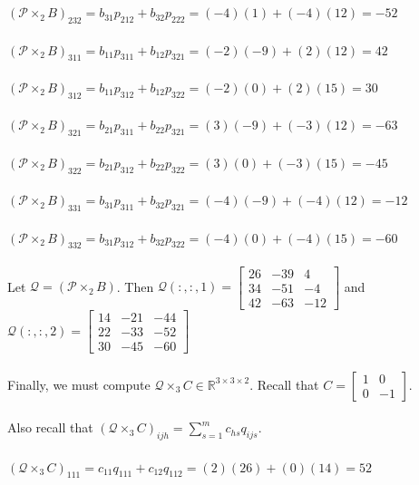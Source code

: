 \documentclass[12pt]{article}
\begin{document}
\\~\\$\left(\mathcal{P} \times_2 B\right)_{232}=b_{31}p_{212}+b_{32}p_{222}=(-4)(1)+(-4)(12)=-52$
\\~\\$\left(\mathcal{P} \times_2 B\right)_{311}=b_{11}p_{311}+b_{12}p_{321}=(-2)(-9)+(2)(12)=42$
\\~\\$\left(\mathcal{P} \times_2 B\right)_{312}=b_{11}p_{312}+b_{12}p_{322}=(-2)(0)+(2)(15)=30$
\\~\\$\left(\mathcal{P} \times_2 B\right)_{321}=b_{21}p_{311}+b_{22}p_{321}=(3)(-9)+(-3)(12)=-63$
\\~\\$\left(\mathcal{P} \times_2 B\right)_{322}=b_{21}p_{312}+b_{22}p_{322}=(3)(0)+(-3)(15)=-45$
\\~\\$\left(\mathcal{P} \times_2 B\right)_{331}=b_{31}p_{311}+b_{32}p_{321}=(-4)(-9)+(-4)(12)=-12$
\\~\\$\left(\mathcal{P} \times_2 B\right)_{332}=b_{31}p_{312}+b_{32}p_{322}=(-4)(0)+(-4)(15)=-60$
\\~\\Let $\mathcal{Q}=\left(\mathcal{P} \times_{2} B\right)$. Then $\mathcal{Q}\left(:, :, 1\right)=\left[\begin{array}{ccc}{26} & {-39} & {4} \\ {34} & {-51} & {-4} \\ {42} & {-63} & {-12}\end{array}\right]$ and $\mathcal{Q}\left(:, :, 2\right)=\left[\begin{array}{ccc}{14} & {-21} & {-44} \\ {22} & {-33} & {-52} \\ {30} & {-45} & {-60}\end{array}\right]$
\\~\\Finally, we must compute $\mathcal{Q} \times_{3} C\in\mathbb{R}^{3\times 3\times 2}$. Recall that $C=\left[\begin{array}{cc}{1} & {0} \\ {0} & {-1}\end{array}\right]$. 
\\~\\Also recall that $\displaystyle\left(\mathcal{Q} \times_{3} C\right)_{i j h}=\sum_{s=1}^{m} c_{h s} q_{i j s}$.
\\~\\$\left(\mathcal{Q}\times_3 C\right)_{111}=c_{11}q_{111}+c_{12}q_{112}=(2)(26)+(0)(14)=52$
\end{document}
